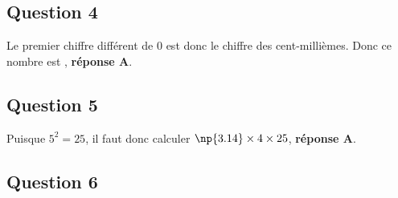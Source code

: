 \subsection*{Question 4}


%
Le premier chiffre différent de $0$ est donc le chiffre des cent-millièmes. Donc ce nombre est , \textbf{réponse A}.
\subsection*{Question 5}


%
Puisque \mbox{$5^2=25$}, il faut donc calculer \mbox{$\np{3.14}\times4\times25$}, \textbf{réponse A}.
\subsection*{Question 6}


